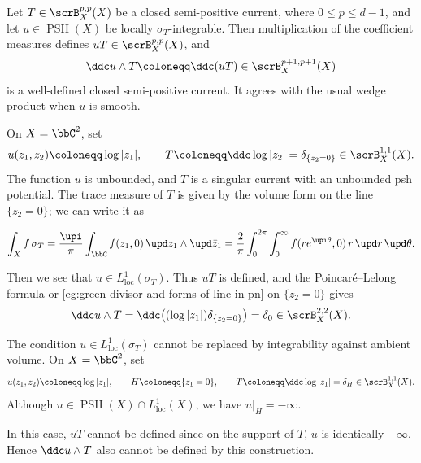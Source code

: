 \begin{proposition}[label=\labelNFM{prop:wedge-of-psh-function-and-semi-positve-currents}, status=draft, tag=0000000, title={{{\cite[Theorem 6.3.1]{Dinh-Sibony-2005-IntroductionTheoryCurrents}}}}]
	Let $T \in \scrB_X^{p,p}(X)$ be a closed semi-positive current, where $0 \leq p \leq d-1$,
	and let $u \in \operatorname{PSH}(X)$ be locally $\sigma_T$-integrable.
	Then multiplication of the coefficient measures defines $uT \in \scrB_X^{p,p}(X)$, and
	\[ \ddc u \wedge T \coloneqq \ddc(uT) \in \scrB_X^{p+1,p+1}(X) \]
	is a well-defined closed semi-positive current.
	It agrees with the usual wedge product when $u$ is smooth.
\end{proposition}

\begin{example}[label=\labelNFM{eg:wedge-of-unbounded-potentials-and-singular-currents}, status=draft, tag=0000000]
	On $X = \bbC^2$, set
	\[ u(z_1,z_2) \coloneqq \log|z_1|, \qquad T \coloneqq \ddc\log|z_2| = \delta_{\{z_2 = 0\}} \in \scrB_X^{1,1}(X). \]
	The function $u$ is unbounded, and $T$ is a singular current with an unbounded psh potential.
  The trace measure of $T$ is given by the volume form on the line $\{z_2 = 0\}$; we can write it as

  \[ \int_X f\,\sigma_T = \frac{\upi}{\pi}\int_{\bbC} f(z_1,0)\,\upd z_1 \wedge \upd\bar z_1 = \frac{2}{\pi}\int_0^{2\pi}\int_0^\infty f(r e^{\upi\theta},0)\,r\,\upd r\,\upd\theta. \]

  Then we see that $u \in L^1_{\mathrm{loc}}(\sigma_T)$.
	Thus $uT$ is defined, and the Poincar\'e--Lelong formula or \cref{eg:green-divisor-and-forms-of-line-in-pn} on $\{z_2 = 0\}$ gives
	\[ \ddc u \wedge T = \ddc\bigl((\log|z_1|)\delta_{\{z_2 = 0\}}\bigr) = \delta_0 \in \scrB_X^{2,2}(X). \]
\end{example}

\begin{example}[label=\labelNFM{eg:fail-of-wedge-of-unbounded-potentials-and-singular-currents}, status=draft, tag=0000000]
	The condition $u \in L^1_{\mathrm{loc}}(\sigma_T)$ cannot be replaced by integrability against ambient volume.
	On $X = \bbC^2$, set
	\[ u(z_1,z_2) \coloneqq \log|z_1|, \qquad H \coloneqq \{z_1 = 0\}, \qquad T \coloneqq \ddc\log|z_1| = \delta_H \in \scrB_X^{1,1}(X). \]
	Although $u \in \operatorname{PSH}(X) \cap L^1_{\mathrm{loc}}(X)$, we have $u|_H = -\infty$.

  In this case, $uT$ cannot be defined since on the support of $T$, $u$ is identically $-\infty$.
  Hence $\ddc u \wedge T$ also cannot be defined by this construction.

\end{example}





















